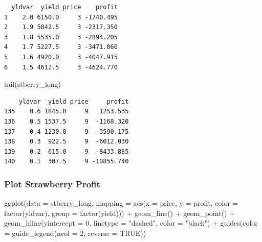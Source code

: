 \documentclass[
  letterpaper,
  DIV=11,
  numbers=noendperiod]{scrartcl}
\newenvironment{Shaded}{\begin{snugshade}}{\end{snugshade}}
\newcommand{\AttributeTok}[1]{\textcolor[rgb]{0.40,0.45,0.13}{#1}}
\newcommand{\ConstantTok}[1]{\textcolor[rgb]{0.56,0.35,0.01}{#1}}
\newcommand{\DecValTok}[1]{\textcolor[rgb]{0.68,0.00,0.00}{#1}}
\newcommand{\FunctionTok}[1]{\textcolor[rgb]{0.28,0.35,0.67}{#1}}
\newcommand{\NormalTok}[1]{\textcolor[rgb]{0.00,0.23,0.31}{#1}}
\newcommand{\SpecialCharTok}[1]{\textcolor[rgb]{0.37,0.37,0.37}{#1}}
\newcommand{\StringTok}[1]{\textcolor[rgb]{0.13,0.47,0.30}{#1}}
\begin{document}
\begin{verbatim}
  yldvar  yield price    profit
1    2.0 6150.0     3 -1740.495
2    1.9 5842.5     3 -2317.350
3    1.8 5535.0     3 -2894.205
4    1.7 5227.5     3 -3471.060
5    1.6 4920.0     3 -4047.915
6    1.5 4612.5     3 -4624.770
\end{verbatim}

\begin{Shaded}
\begin{Highlighting}[]
\FunctionTok{tail}\NormalTok{(stberry\_long)}
\end{Highlighting}
\end{Shaded}

\begin{verbatim}
    yldvar  yield price     profit
135    0.6 1845.0     9   1253.535
136    0.5 1537.5     9  -1168.320
137    0.4 1230.0     9  -3590.175
138    0.3  922.5     9  -6012.030
139    0.2  615.0     9  -8433.885
140    0.1  307.5     9 -10855.740
\end{verbatim}

\subsubsection{Plot Strawberry Profit}\label{plot-strawberry-profit}

\begin{Shaded}
\begin{Highlighting}[]
\FunctionTok{ggplot}\NormalTok{(}\AttributeTok{data =}\NormalTok{ stberry\_long,}
       \AttributeTok{mapping =} \FunctionTok{aes}\NormalTok{(}\AttributeTok{x =}\NormalTok{ price,}
                     \AttributeTok{y =}\NormalTok{ profit,}
                     \AttributeTok{color =} \FunctionTok{factor}\NormalTok{(yldvar),}
                     \AttributeTok{group =} \FunctionTok{factor}\NormalTok{(yield))) }\SpecialCharTok{+}
  \FunctionTok{geom\_line}\NormalTok{() }\SpecialCharTok{+}
  \FunctionTok{geom\_point}\NormalTok{() }\SpecialCharTok{+}
  \FunctionTok{geom\_hline}\NormalTok{(}\AttributeTok{yintercept =} \DecValTok{0}\NormalTok{,}
             \AttributeTok{linetype =} \StringTok{"dashed"}\NormalTok{,}
             \AttributeTok{color =} \StringTok{"black"}\NormalTok{) }\SpecialCharTok{+}
  \FunctionTok{guides}\NormalTok{(}\AttributeTok{color =} \FunctionTok{guide\_legend}\NormalTok{(}\AttributeTok{ncol =} \DecValTok{2}\NormalTok{,}
                              \AttributeTok{reverse =} \ConstantTok{TRUE}\NormalTok{))}
\end{Highlighting}
\end{Shaded}
\end{document}

